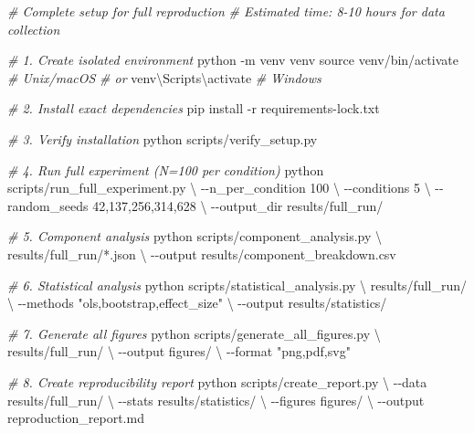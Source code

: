 \documentclass[
  11pt]{article}
\newenvironment{Shaded}{}{}
\newcommand{\AttributeTok}[1]{\textcolor[rgb]{0.49,0.56,0.16}{#1}}
\newcommand{\BuiltInTok}[1]{\textcolor[rgb]{0.00,0.50,0.00}{#1}}
\newcommand{\CommentTok}[1]{\textcolor[rgb]{0.38,0.63,0.69}{\textit{#1}}}
\newcommand{\DataTypeTok}[1]{\textcolor[rgb]{0.56,0.13,0.00}{#1}}
\newcommand{\ExtensionTok}[1]{#1}
\newcommand{\NormalTok}[1]{#1}
\newcommand{\PreprocessorTok}[1]{\textcolor[rgb]{0.74,0.48,0.00}{#1}}
\newcommand{\StringTok}[1]{\textcolor[rgb]{0.25,0.44,0.63}{#1}}
\begin{document}
\begin{Shaded}
\begin{Highlighting}[]
\CommentTok{\# Complete setup for full reproduction}
\CommentTok{\# Estimated time: 8{-}10 hours for data collection}

\CommentTok{\# 1. Create isolated environment}
\ExtensionTok{python} \AttributeTok{{-}m}\NormalTok{ venv venv}
\BuiltInTok{source}\NormalTok{ venv/bin/activate  }\CommentTok{\# Unix/macOS}
\CommentTok{\# or}
\ExtensionTok{venv\textbackslash{}Scripts\textbackslash{}activate}  \CommentTok{\# Windows}

\CommentTok{\# 2. Install exact dependencies}
\ExtensionTok{pip}\NormalTok{ install }\AttributeTok{{-}r}\NormalTok{ requirements{-}lock.txt}

\CommentTok{\# 3. Verify installation}
\ExtensionTok{python}\NormalTok{ scripts/verify\_setup.py}

\CommentTok{\# 4. Run full experiment (N=100 per condition)}
\ExtensionTok{python}\NormalTok{ scripts/run\_full\_experiment.py }\DataTypeTok{\textbackslash{}}
    \AttributeTok{{-}{-}n\_per\_condition}\NormalTok{ 100 }\DataTypeTok{\textbackslash{}}
    \AttributeTok{{-}{-}conditions}\NormalTok{ 5 }\DataTypeTok{\textbackslash{}}
    \AttributeTok{{-}{-}random\_seeds}\NormalTok{ 42,137,256,314,628 }\DataTypeTok{\textbackslash{}}
    \AttributeTok{{-}{-}output\_dir}\NormalTok{ results/full\_run/}

\CommentTok{\# 5. Component analysis}
\ExtensionTok{python}\NormalTok{ scripts/component\_analysis.py }\DataTypeTok{\textbackslash{}}
\NormalTok{    results/full\_run/}\PreprocessorTok{*}\NormalTok{.json }\DataTypeTok{\textbackslash{}}
    \AttributeTok{{-}{-}output}\NormalTok{ results/component\_breakdown.csv}

\CommentTok{\# 6. Statistical analysis}
\ExtensionTok{python}\NormalTok{ scripts/statistical\_analysis.py }\DataTypeTok{\textbackslash{}}
\NormalTok{    results/full\_run/ }\DataTypeTok{\textbackslash{}}
    \AttributeTok{{-}{-}methods} \StringTok{"ols,bootstrap,effect\_size"} \DataTypeTok{\textbackslash{}}
    \AttributeTok{{-}{-}output}\NormalTok{ results/statistics/}

\CommentTok{\# 7. Generate all figures}
\ExtensionTok{python}\NormalTok{ scripts/generate\_all\_figures.py }\DataTypeTok{\textbackslash{}}
\NormalTok{    results/full\_run/ }\DataTypeTok{\textbackslash{}}
    \AttributeTok{{-}{-}output}\NormalTok{ figures/ }\DataTypeTok{\textbackslash{}}
    \AttributeTok{{-}{-}format} \StringTok{"png,pdf,svg"}

\CommentTok{\# 8. Create reproducibility report}
\ExtensionTok{python}\NormalTok{ scripts/create\_report.py }\DataTypeTok{\textbackslash{}}
    \AttributeTok{{-}{-}data}\NormalTok{ results/full\_run/ }\DataTypeTok{\textbackslash{}}
    \AttributeTok{{-}{-}stats}\NormalTok{ results/statistics/ }\DataTypeTok{\textbackslash{}}
    \AttributeTok{{-}{-}figures}\NormalTok{ figures/ }\DataTypeTok{\textbackslash{}}
    \AttributeTok{{-}{-}output}\NormalTok{ reproduction\_report.md}
\end{Highlighting}
\end{Shaded}
\end{document}
